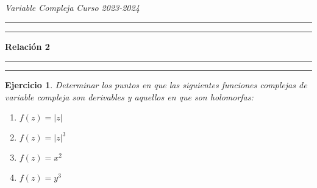 \documentclass[11pt]{report}
\newtheorem{exercise}{Ejercicio}
\theoremstyle{remark}
\begin{document}
\textit{Variable Compleja} \hfill \textit{Curso 2023-2024}

\vspace{-5mm}

\begin{center}

	\rule{\textwidth}{1.6pt}\vspace*{-\baselineskip}\vspace*{2pt} %
	\rule{\textwidth}{0.4pt} %
	
	{\LARGE \textbf{Relación 2}} %
	
	\rule[0.66\baselineskip]{\textwidth}{0.4pt}\vspace*{-\baselineskip}\vspace{3.2pt} %
	\rule[0.66\baselineskip]{\textwidth}{1.6pt} %

\end{center}

\begin{exercise}
Determinar los puntos en que las siguientes funciones complejas de variable compleja son derivables y aquellos en que son holomorfas:
\begin{enumerate}
    \item $f(z)=|z|$
    \item $f(z)=|z|^3$
    \item $f(z)=x^2$
    \item $f(z)=y^3$
\end{enumerate}
\end{exercise}
\end{document}
